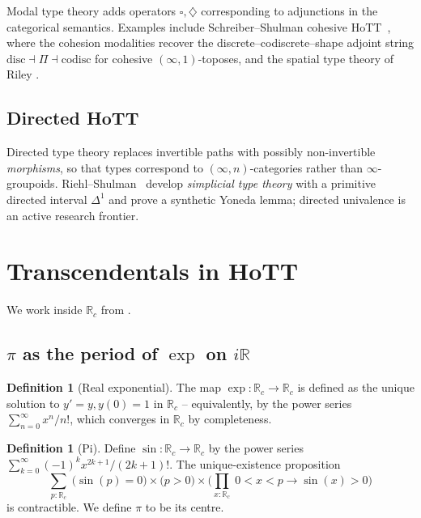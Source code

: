 \documentclass[12pt]{article}
\theoremstyle{definition}
\newtheorem{definition}[theorem]{Definition}
\theoremstyle{remark}
\newcommand{\R}{\mathbb{R}}
\begin{document}
Modal type theory adds operators $\square, \diamondsuit$ corresponding to
adjunctions in the categorical semantics. Examples include
Schreiber--Shulman cohesive HoTT~\cite{SchreiberShulman}, where the
cohesion modalities recover the discrete--codiscrete--shape adjoint string
$\mathrm{disc} \dashv \Pi \dashv \mathrm{codisc}$ for cohesive
$(\infty,1)$-toposes, and the spatial type theory of Riley
\cite{Riley}.

\subsection{Directed HoTT}

Directed type theory replaces invertible paths with possibly non-invertible
\emph{morphisms}, so that types correspond to $(\infty, n)$-categories
rather than $\infty$-groupoids. Riehl--Shulman~\cite{RiehlShulman} develop
\emph{simplicial type theory} with a primitive directed interval $\Delta^1$
and prove a synthetic Yoneda lemma; directed univalence
\cite{CisinskiNguyen} is an active research frontier.

\section{Transcendentals in HoTT}
\label{sec:transcendentals}

We work inside $\R_c$ from .

\subsection{\texorpdfstring{$\pi$}{pi} as the period of \texorpdfstring{$\exp$}{exp} on \texorpdfstring{$i\R$}{iR}}

\begin{definition}[Real exponential]
The map $\exp : \R_c \to \R_c$ is defined as the unique solution to
$y' = y, y(0) = 1$ in $\R_c$ -- equivalently, by the power series
$\sum_{n=0}^{\infty} x^n / n!$, which converges in $\R_c$ by completeness.
\end{definition}

\begin{definition}[Pi]
\label{def:pi}
Define $\sin : \R_c \to \R_c$ by the power series
$\sum_{k=0}^\infty (-1)^k x^{2k+1}/(2k+1)!$. The unique-existence
proposition
\[
\sum_{p : \R_c}\;\bigl(\sin(p) = 0\bigr) \times \bigl(p > 0\bigr) \times
\bigl(\prod_{x : \R_c}\;0 < x < p \to \sin(x) > 0\bigr)
\]
is contractible. We define $\pi$ to be its centre.
\end{definition}
\end{document}

